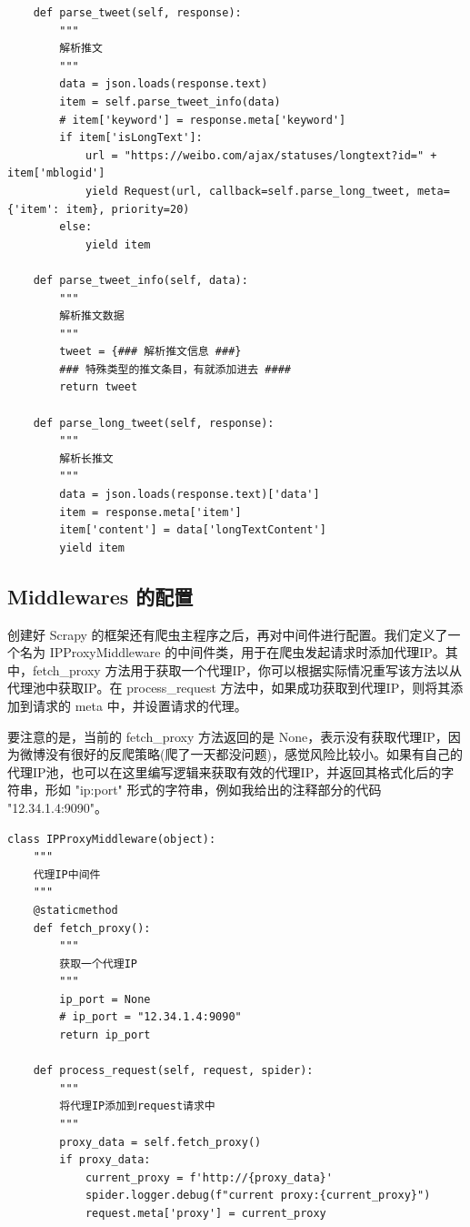 \documentclass[12pt,hyperref,a4paper,UTF8]{ctexart}
\begin{document}
\begin{verbatim}  
    def parse_tweet(self, response):
        """
        解析推文
        """
        data = json.loads(response.text)
        item = self.parse_tweet_info(data)
        # item['keyword'] = response.meta['keyword']
        if item['isLongText']:
            url = "https://weibo.com/ajax/statuses/longtext?id=" + item['mblogid']
            yield Request(url, callback=self.parse_long_tweet, meta={'item': item}, priority=20)
        else:
            yield item

    def parse_tweet_info(self, data):
        """
        解析推文数据
        """
        tweet = {### 解析推文信息 ###}
        ### 特殊类型的推文条目，有就添加进去 ####
        return tweet

    def parse_long_tweet(self, response):
        """
        解析长推文
        """
        data = json.loads(response.text)['data']
        item = response.meta['item']
        item['content'] = data['longTextContent']
        yield item
\end{verbatim}

\subsection{Middlewares 的配置}

创建好 Scrapy 的框架还有爬虫主程序之后，再对中间件进行配置。我们定义了一个名为 IPProxyMiddleware 的中间件类，用于在爬虫发起请求时添加代理IP。其中，fetch\_proxy 方法用于获取一个代理IP，你可以根据实际情况重写该方法以从代理池中获取IP。在 process\_request 方法中，如果成功获取到代理IP，则将其添加到请求的 meta 中，并设置请求的代理。

要注意的是，当前的 fetch\_proxy 方法返回的是 None，表示没有获取代理IP，因为微博没有很好的反爬策略(爬了一天都没问题)，感觉风险比较小。如果有自己的代理IP池，也可以在这里编写逻辑来获取有效的代理IP，并返回其格式化后的字符串，形如 "ip:port" 形式的字符串，例如我给出的注释部分的代码 "12.34.1.4:9090"。

\begin{verbatim} 
class IPProxyMiddleware(object):
    """
    代理IP中间件
    """
    @staticmethod
    def fetch_proxy():
        """
        获取一个代理IP
        """
        ip_port = None
        # ip_port = "12.34.1.4:9090"
        return ip_port

    def process_request(self, request, spider):
        """
        将代理IP添加到request请求中
        """
        proxy_data = self.fetch_proxy()
        if proxy_data:
            current_proxy = f'http://{proxy_data}'
            spider.logger.debug(f"current proxy:{current_proxy}")
            request.meta['proxy'] = current_proxy
\end{verbatim}         
\end{document}
